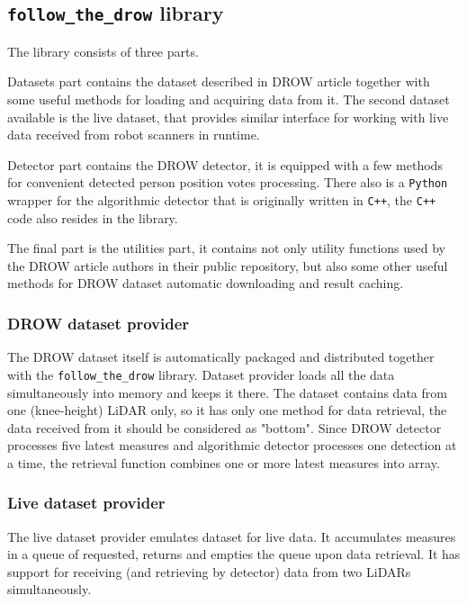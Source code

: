 \documentclass{article}
\begin{document}
\subsection{\texttt{follow\_the\_drow} library}

The library consists of three parts.

Datasets part contains the dataset described in DROW article together with some useful methods for loading and acquiring data from it.
The second dataset available is the live dataset, that provides similar interface for working with live data received from robot scanners in runtime.

Detector part contains the DROW detector, it is equipped with a few methods for convenient detected person position votes processing.
There also is a \texttt{Python} wrapper for the algorithmic detector that is originally written in \texttt{C++}, the \texttt{C++} code also resides in the library.

The final part is the utilities part, it contains not only utility functions used by the DROW article authors in their public repository, but also some other useful methods for DROW dataset automatic downloading and result caching.

\subsubsection{DROW dataset provider}

The DROW dataset itself is automatically packaged and distributed together with the \texttt{follow\_the\_drow} library.
Dataset provider loads all the data simultaneously into memory and keeps it there.
The dataset contains data from one (knee-height) LiDAR only, so it has only one method for data retrieval, the data received from it should be considered as "bottom".
Since DROW detector processes five latest measures and algorithmic detector processes one detection at a time, the retrieval function combines one or more latest measures into array.

\subsubsection{Live dataset provider}

The live dataset provider emulates dataset for live data.
It accumulates measures in a queue of requested, returns and empties the queue upon data retrieval.
It has support for receiving (and retrieving by detector) data from two LiDARs simultaneously.
\end{document}
